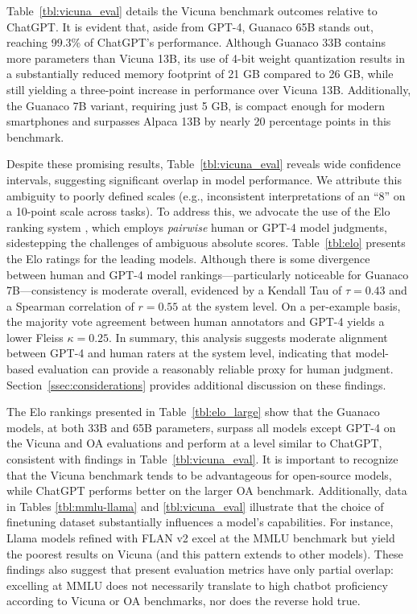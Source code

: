 Table~\ref{tbl:vicuna_eval} details the Vicuna benchmark \cite{vicuna2023} outcomes relative to ChatGPT. It is evident that, aside from GPT-4, {Guanaco} 65B stands out, reaching 99.3\% of ChatGPT’s performance. Although {Guanaco} 33B contains more parameters than Vicuna 13B, its use of 4-bit weight quantization results in a substantially reduced memory footprint of 21 GB compared to 26 GB, while still yielding a three-point increase in performance over Vicuna 13B. Additionally, the {Guanaco} 7B variant, requiring just 5 GB, is compact enough for modern smartphones and surpasses Alpaca 13B by nearly 20 percentage points in this benchmark.

Despite these promising results, Table~\ref{tbl:vicuna_eval} reveals wide confidence intervals, suggesting significant overlap in model performance. We attribute this ambiguity to poorly defined scales (e.g., inconsistent interpretations of an “8” on a 10-point scale across tasks). To address this, we advocate the use of the Elo ranking system \citep{elo1967proposed}, which employs \textit{pairwise} human or GPT-4 model judgments, sidestepping the challenges of ambiguous absolute scores. Table~\ref{tbl:elo} presents the Elo ratings for the leading models. Although there is some divergence between human and GPT-4 model rankings—particularly noticeable for Guanaco 7B—consistency is moderate overall, evidenced by a Kendall Tau of $\tau=0.43$ and a Spearman correlation of $r=0.55$ at the system level. On a per-example basis, the majority vote agreement between human annotators and GPT-4 yields a lower Fleiss $\kappa=0.25$. In summary, this analysis suggests moderate alignment between GPT-4 and human raters at the system level, indicating that model-based evaluation can provide a reasonably reliable proxy for human judgment. Section~\ref{ssec:considerations} provides additional discussion on these findings.

The Elo rankings presented in Table~\ref{tbl:elo_large} show that the {Guanaco} models, at both 33B and 65B parameters, surpass all models except GPT-4 on the Vicuna and OA evaluations and perform at a level similar to ChatGPT, consistent with findings in Table~\ref{tbl:vicuna_eval}. It is important to recognize that the Vicuna benchmark tends to be advantageous for open-source models, while ChatGPT performs better on the larger OA benchmark. Additionally, data in Tables \ref{tbl:mmlu-llama} and \ref{tbl:vicuna_eval} illustrate that the choice of finetuning dataset substantially influences a model’s capabilities. For instance, Llama models refined with FLAN v2 excel at the MMLU benchmark but yield the poorest results on Vicuna (and this pattern extends to other models). These findings also suggest that present evaluation metrics have only partial overlap: excelling at MMLU does not necessarily translate to high chatbot proficiency according to Vicuna or OA benchmarks, nor does the reverse hold true.


